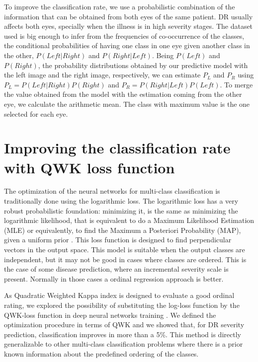 \documentclass{dcsm}
\begin{document}
To improve the classification rate, we use a probabilistic combination of 
the information that can be obtained from both eyes of the same patient.
DR usually affects both eyes, specially when the illness is in high severity stages. The dataset used is big enough to infer from the frequencies of co-occurrence of the classes, the conditional probabilities of having one class in one eye given another class in the other, $P(Left|Right)$ and $P(Right|Left)$. 
Being $P(Left)$ and $P(Right)$, the probability distributions obtained by our predictive model with the left image and the right image, respectively, we can estimate $P_L$ and $P_R$ using $P_L = P(Left|Right)P(Right)$ and  $P_R = P(Right|Left)P(Left)$. To merge the value obtained from the model with the estimation coming from the other eye, we calculate the arithmetic mean. The class with maximum value is the one selected for each eye.

\section{Improving the classification rate with QWK loss function}

The optimization of the neural networks for multi-class classification is traditionally done using the logarithmic loss. The logarithmic loss has a very robust probabilistic foundation: minimizing it, is the same as minimizing the logarithmic likelihood, that is equivalent to do a Maximum Likelihood Estimation (MLE) or equivalently, to find the Maximum a Posteriori Probability (MAP), given a uniform prior \cite{Murphy:2012:MLP:2380985}. This loss function is designed to find perpendicular vectors in the output space. This model is suitable when the output classes are independent, but it may not be good in cases where classes are ordered. This is the case of some disease prediction, where an incremental severity scale is present. Normally in those cases a ordinal regression approach is better. 

As Quadratic Weighted Kappa index is designed to evaluate a good ordinal rating, we explored the possibility of substituting the log-loss function by the QWK-loss function in deep neural networks training \cite{delaTorre2017}. We defined the optimization procedure in terms of QWK and we showed that, for DR severity prediction, classification improves in more than a 5\%. This method is directly generalizable to other multi-class classification problems where there is a prior known information about the predefined ordering of the classes. 
\end{document}
